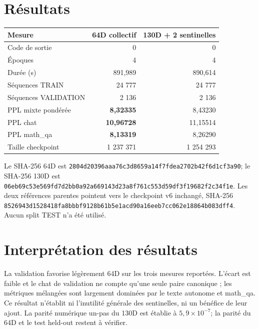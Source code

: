 \documentclass[11pt,a4paper]{report}
\begin{document}
\section{Résultats}
\begin{center}
\begin{tabular}{lrr}
\toprule
Mesure & 64D collectif & 130D + 2 sentinelles\\
\midrule
Code de sortie & 0 & 0\\
Époques & 4 & 4\\
Durée (s) & 891,989 & 890,614\\
Séquences TRAIN & 24 777 & 24 777\\
Séquences VALIDATION & 2 136 & 2 136\\
PPL mixte pondérée & \textbf{8,32335} & 8,43230\\
PPL chat & \textbf{10,96728} & 11,15514\\
PPL math\_qa & \textbf{8,13319} & 8,26290\\
Taille checkpoint & 1 237 371 & 1 254 293\\
\bottomrule
\end{tabular}
\end{center}
\begin{sloppypar}
Le SHA-256 64D est \texttt{2804d203\allowbreak 96aaa76c\allowbreak 3d8659a1\allowbreak 4f7fdea2\allowbreak 702b42f6\allowbreak d1cf3a90}; le SHA-256 130D est \texttt{06eb69c5\allowbreak 3e569fd7\allowbreak d2bb0a92\allowbreak a669143d\allowbreak 23a8f761\allowbreak c553d59d\allowbreak f3f19682\allowbreak f2c34f1e}. Les deux références parentes pointent vers le checkpoint v6 inchangé, SHA-256 \texttt{8526943d\allowbreak 1528418f\allowbreak a8bbbf91\allowbreak 28b61b5e\allowbreak 1acd90a1\allowbreak 6eeb7cc0\allowbreak 62e18864\allowbreak b083dff4}. Aucun split TEST n'a été utilisé.
\end{sloppypar}
\section{Interprétation des résultats}
La validation favorise légèrement 64D sur les trois mesures reportées. L'écart est faible et le chat de validation ne compte qu'une seule paire canonique ; les métriques mélangées sont largement dominées par le texte autonome et math\_qa. Ce résultat n'établit ni l'inutilité générale des sentinelles, ni un bénéfice de leur ajout. La parité numérique un-pas du 130D est établie à $5,9\times10^{-7}$; la parité du 64D et le test held-out restent à vérifier.
\end{document}
